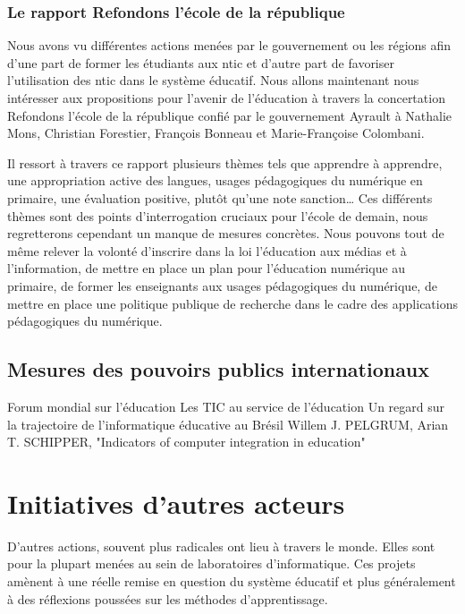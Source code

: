 \subsection{Le rapport \og{}Refondons l'école de la république\fg{}}

Nous avons vu différentes actions menées par le gouvernement ou les régions afin d'une part de former les étudiants aux \gls{ntic} et d'autre part de favoriser l'utilisation des \gls{ntic} dans le système éducatif. Nous allons maintenant nous intéresser aux propositions pour l'avenir de l'éducation à travers la concertation \og{}Refondons l'école de la république\fg{} confié par le gouvernement Ayrault à Nathalie Mons, Christian Forestier, François Bonneau et Marie-Françoise Colombani. 

Il ressort à travers ce rapport plusieurs thèmes tels que \og{}apprendre à apprendre\fg{}, \og{}une appropriation active des langues\fg{}, \og{}usages pédagogiques du numérique en primaire\fg{}, \og{}une évaluation positive, plutôt qu'une note sanction\fg{}… Ces différents thèmes sont des points d'interrogation cruciaux pour l'école de demain, nous regretterons cependant un manque de mesures concrètes. Nous pouvons tout de même relever la volonté d'inscrire dans la loi \og l'éducation aux médias et à l'information\fg{}, de mettre en place un plan pour l'éducation numérique au primaire, de former les enseignants aux usages pédagogiques du numérique, de mettre en place une politique publique de recherche dans le cadre des applications pédagogiques du numérique.

\section{Mesures des pouvoirs publics internationaux}
Forum mondial sur l’éducation \cite{educ_forum}
Les TIC au service de l’éducation \cite{tics}
Un regard sur la trajectoire de l’informatique éducative au Brésil \cite{peixoto2006regard}
Willem J. PELGRUM, Arian T. SCHIPPER, "Indicators of computer integration in education" \cite{pelgrum1993indicators}


\chapter{Initiatives d'autres acteurs}
\label{chap:initialivesautres}

D'autres actions, souvent plus radicales ont lieu à travers le monde. Elles sont pour la plupart menées au sein de laboratoires d'informatique. Ces projets amènent à une réelle remise en question du système éducatif et plus généralement à des réflexions poussées sur les méthodes d'apprentissage.

